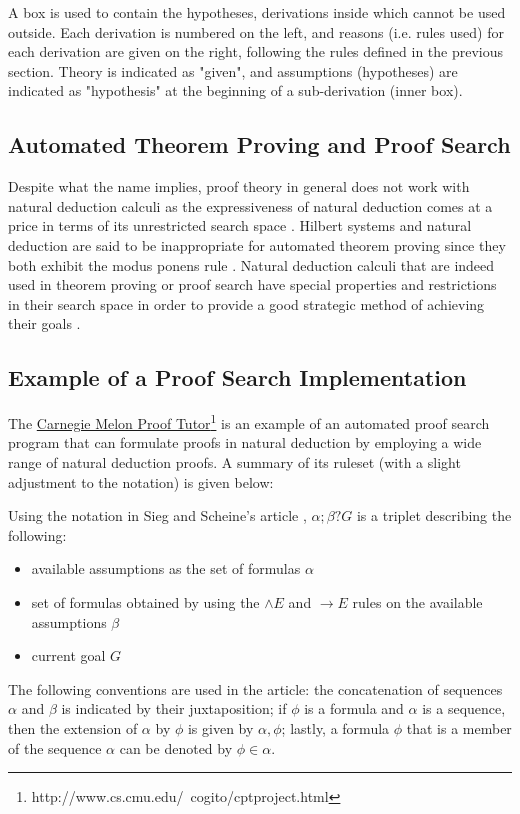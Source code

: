 \documentclass[11pt,twoside,a4paper]{report}
\begin{document}
A box is used to contain the hypotheses, derivations inside which cannot be used outside. Each derivation is numbered on the left, and reasons (i.e. rules used) for each derivation are given on the right, following the rules defined in the previous section. Theory is indicated as "given", and assumptions (hypotheses) are indicated as "hypothesis" at the beginning of a sub-derivation (inner box).

\subsection{Automated Theorem Proving and Proof Search}
Despite what the name implies, proof theory in general does not work with natural deduction calculi as the expressiveness of natural deduction comes at a price in terms of its unrestricted search space \citep*[pp. 140-141]{siegfried}. Hilbert systems and natural deduction are said to be inappropriate for automated theorem proving since they both exhibit the modus ponens rule \citep*[p. 95]{autobots}. Natural deduction calculi that are indeed used in theorem proving or proof search have special properties and restrictions in their search space in order to provide a good strategic method of achieving their goals \citep*[pp. 140-141]{siegfried}.

\subsection{Example of a Proof Search Implementation}
The \href{http://www.cs.cmu.edu/~cogito/cptproject.html}{Carnegie Melon Proof Tutor}\footnote{http://www.cs.cmu.edu/~cogito/cptproject.html} is an example of an automated proof search program that can formulate proofs in natural deduction by employing a wide range of natural deduction proofs. A summary of its ruleset (with a slight adjustment to the notation) is given below:

Using the notation in Sieg and Scheine's article \citep{siegfried}, $\alpha;\beta?G$ is a triplet describing the following:
\begin{itemize}
\item
available assumptions as the set of formulas $\alpha$
\item
set of formulas obtained by using the $\wedge E$ and $\rightarrow E$ rules on the available assumptions $\beta$
\item
current goal $G$
\end{itemize}

The following conventions are used in the article: the concatenation of sequences $\alpha$ and $\beta$ is indicated by their juxtaposition; if $\phi$ is a formula and $\alpha$ is a sequence, then the extension of $\alpha$ by $\phi$ is given by $\alpha,\phi$; lastly, a formula $\phi$ that is a member of the sequence $\alpha$ can be denoted by $\phi \in \alpha$.
\end{document}
